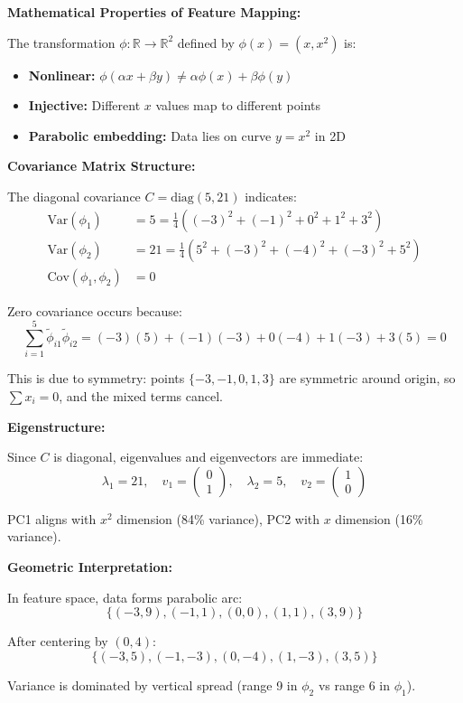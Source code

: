 \documentclass[12pt]{article}
\begin{document}
\begin{explanation}

\textbf{Mathematical Properties of Feature Mapping:}

The transformation $\phi: \mathbb{R} \to \mathbb{R}^2$ defined by $\phi(x) = (x, x^2)$ is:
\begin{itemize}
    \item \textbf{Nonlinear:} $\phi(\alpha x + \beta y) \neq \alpha\phi(x) + \beta\phi(y)$
    \item \textbf{Injective:} Different $x$ values map to different points
    \item \textbf{Parabolic embedding:} Data lies on curve $y = x^2$ in 2D
\end{itemize}

\textbf{Covariance Matrix Structure:}

The diagonal covariance $C = \text{diag}(5, 21)$ indicates:
\begin{align*}
\text{Var}(\phi_1) &= 5 = \frac{1}{4}((-3)^2 + (-1)^2 + 0^2 + 1^2 + 3^2) \\
\text{Var}(\phi_2) &= 21 = \frac{1}{4}(5^2 + (-3)^2 + (-4)^2 + (-3)^2 + 5^2) \\
\text{Cov}(\phi_1, \phi_2) &= 0
\end{align*}

Zero covariance occurs because:
\[
\sum_{i=1}^5 \tilde{\phi}_{i1} \tilde{\phi}_{i2} = (-3)(5) + (-1)(-3) + 0(-4) + 1(-3) + 3(5) = 0
\]

This is due to symmetry: points $\{-3, -1, 0, 1, 3\}$ are symmetric around origin, so $\sum x_i = 0$, and the mixed terms cancel.

\textbf{Eigenstructure:}

Since $C$ is diagonal, eigenvalues and eigenvectors are immediate:
\[
\lambda_1 = 21, \quad v_1 = \begin{pmatrix} 0 \\ 1 \end{pmatrix}, \quad
\lambda_2 = 5, \quad v_2 = \begin{pmatrix} 1 \\ 0 \end{pmatrix}
\]

PC1 aligns with $x^2$ dimension (84\% variance), PC2 with $x$ dimension (16\% variance).

\textbf{Geometric Interpretation:}

In feature space, data forms parabolic arc:
\[
\{(-3, 9), (-1, 1), (0, 0), (1, 1), (3, 9)\}
\]

After centering by $(0, 4)$:
\[
\{(-3, 5), (-1, -3), (0, -4), (1, -3), (3, 5)\}
\]

Variance is dominated by vertical spread (range 9 in $\phi_2$ vs range 6 in $\phi_1$).

\end{explanation}
\end{document}
